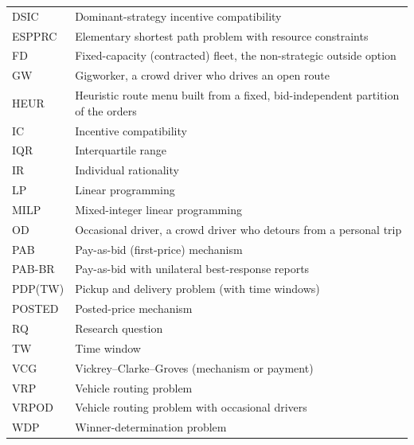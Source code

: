 \clearpage
{}

\begin{singlespace}
\begin{tabular}{@{}P{3.2cm}P{11.5cm}@{}}
DSIC     & Dominant-strategy incentive compatibility\\[3pt]
ESPPRC   & Elementary shortest path problem with resource constraints\\[3pt]
FD       & Fixed-capacity (contracted) fleet, the non-strategic outside option\\[3pt]
GW       & Gigworker, a crowd driver who drives an open route\\[3pt]
HEUR     & Heuristic route menu built from a fixed, bid-independent partition of the orders\\[3pt]
IC       & Incentive compatibility\\[3pt]
IQR      & Interquartile range\\[3pt]
IR       & Individual rationality\\[3pt]
LP       & Linear programming\\[3pt]
MILP     & Mixed-integer linear programming\\[3pt]
OD       & Occasional driver, a crowd driver who detours from a personal trip\\[3pt]
PAB      & Pay-as-bid (first-price) mechanism\\[3pt]
PAB-BR   & Pay-as-bid with unilateral best-response reports\\[3pt]
PDP(TW)  & Pickup and delivery problem (with time windows)\\[3pt]
POSTED   & Posted-price mechanism\\[3pt]
RQ       & Research question\\[3pt]
TW       & Time window\\[3pt]
VCG      & Vickrey--Clarke--Groves (mechanism or payment)\\[3pt]
VRP      & Vehicle routing problem\\[3pt]
VRPOD    & Vehicle routing problem with occasional drivers\\[3pt]
WDP      & Winner-determination problem\\
\end{tabular}
\end{singlespace}
